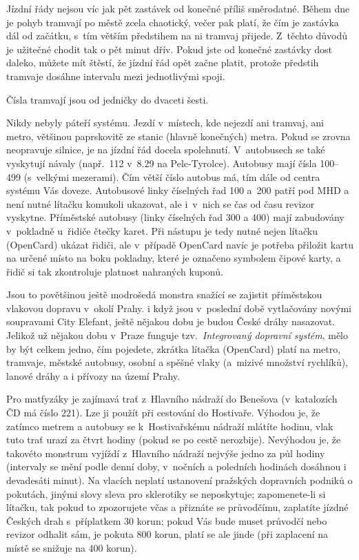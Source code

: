 Jízdní řády nejsou víc jak pět zastávek od konečné příliš
směrodatné. Během dne je pohyb tramvají po městě zcela chaotický,
večer pak platí, že čím je zastávka dál od začátku, s~tím větším
předstihem na ni tramvaj přijede. Z~těchto důvodů je užitečné
chodit tak o pět minut dřív. Pokud jste od konečné zastávky dost
daleko, můžete mít štěstí, že jízdní řád opět začne platit,
protože předstih tramvaje dosáhne intervalu mezi jednotlivými
spoji.

Čísla tramvají jsou od jedničky do dvaceti šesti.


Nikdy nebyly páteří systému. Jezdí v~místech, kde nejezdí ani
tramvaj, ani metro, většinou paprskovitě ze stanic (hlavně
konečných) metra. Pokud se zrovna neopravuje silnice, je na jízdní
řád docela spolehnutí. V~autobusech se také vyskytují návaly
(např.~112 v~8.29 na Pelc-Tyrolce). Autobusy mají čísla 100--499
(s~velkými mezerami). Čím větší číslo autobus má, tím dále od
centra systému Vás doveze. Autobusové linky číselných řad 100
a~200 patří pod MHD a není nutné lítačku komukoli ukazovat, ale
i~v~nich se čas od času revizor vyskytne. Příměstské autobusy (linky
číselných řad 300 a 400) mají zabudovány v~pokladně u~řidiče
čtečky karet. Při nástupu je tedy nutné nejen lítačku (OpenCard)
ukázat řidiči, ale v~případě OpenCard navíc je potřeba přiložit
kartu na určené místo na boku pokladny, které je označeno symbolem
čipové karty, a řidič si tak zkontroluje platnost nahraných
kuponů.


Jsou to povětšinou ještě modrošedá monstra snažící se zajistit
příměstskou vlakovou dopravu v~okolí Prahy. i když jsou v~poslední
době vytlačovány novými soupravami City Elefant, ještě nějakou
dobu je budou České dráhy nasazovat. Jelikož už nějakou dobu
v~Praze funguje tzv.~{\it Integrovaný dopravní systém}, mělo by
být celkem jedno, čím pojedete, zkrátka lítačka (OpenCard) platí
na metro, tramvaje, městské autobusy, osobní a spěšné vlaky
(a~mizivé množství rychlíků), lanové dráhy a i přívozy na území
Prahy.

Pro matfyzáky je zajímavá trať z~Hlavního nádraží do Benešova
(v~katalozích ČD má číslo 221). Lze ji použít při cestování do
Hostivaře. Výhodou je, že zatímco metrem a autobusy se
k~Hostivařskému nádraží mlátíte hodinu, vlak tuto trať urazí za
čtvrt hodiny (pokud se po cestě nerozbije). Nevýhodou je, že
takovéto monstrum vyjíždí z~Hlavního nádraží nejvýše jedno za půl
hodiny (intervaly se mění podle denní doby, v~nočních a poledních
hodinách dosáhnou i devadesáti minut). Na vlacích neplatí
ustanovení pražských dopravních podniků o pokutách, jinými slovy
sleva pro sklerotiky se neposkytuje; zapomenete-li si lítačku, tak
pokud to zpozorujete včas a přiznáte se průvodčímu, zaplatíte
jízdné Českých drah s~příplatkem 30 korun; pokud Vás bude muset
průvodčí nebo revizor odhalit sám, je pokuta 800 korun, platí se
ale jinde (při zaplacení na místě se snižuje na 400 korun).

